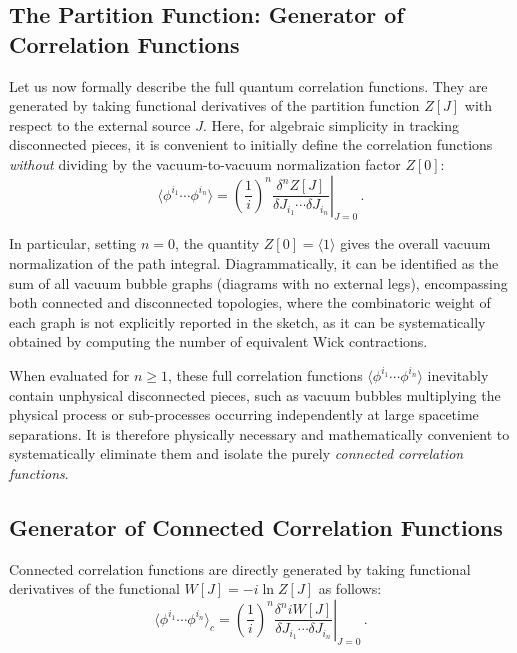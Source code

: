 
\subsection{The Partition Function: Generator of Correlation Functions}

Let us now formally describe the full quantum correlation functions. They are generated by taking functional derivatives of the partition function \(Z[J]\) with respect to the external source \(J\). Here, for algebraic simplicity in tracking disconnected pieces, it is convenient to initially define the correlation functions \textit{without} dividing by the vacuum-to-vacuum normalization factor \(Z[0]\):
\begin{equation} \label{eq:unnormalized_correlators}
    \boxed{\langle \phi^{i_1} \cdots \phi^{i_n} \rangle = \left. \left(\frac{1}{i}\right)^n \frac{\delta^n Z[J]}{\delta J_{i_1} \cdots \delta J_{i_n}} \right|_{J=0}} \, .
\end{equation}


In particular, setting \(n=0\), the quantity \(Z[0] = \langle 1 \rangle\) gives the overall vacuum normalization of the path integral. Diagrammatically, it can be identified as the sum of all vacuum bubble graphs (diagrams with no external legs), encompassing both connected and disconnected topologies, where the combinatoric weight of each graph is not explicitly reported in the sketch, as it can be systematically obtained by computing the number of equivalent Wick contractions.

When evaluated for \(n \ge 1\), these full correlation functions \(\langle \phi^{i_1} \cdots \phi^{i_n} \rangle\) inevitably contain unphysical disconnected pieces, such as vacuum bubbles multiplying the physical process or sub-processes occurring independently at large spacetime separations. It is therefore physically necessary and mathematically convenient to systematically eliminate them and isolate the purely \textit{connected correlation functions}.

\subsection{Generator of Connected Correlation Functions}

Connected correlation functions are directly generated by taking functional derivatives of the functional \(W[J] = -i \ln Z[J]\) as follows:
\begin{equation} \label{eq:connected_correlators_def}
    \boxed{\langle \phi^{i_1} \cdots \phi^{i_n} \rangle_c = \left. \left(\frac{1}{i}\right)^n \frac{\delta^n iW[J]}{\delta J_{i_1} \cdots \delta J_{i_n}} \right|_{J=0}} \, .
\end{equation}

